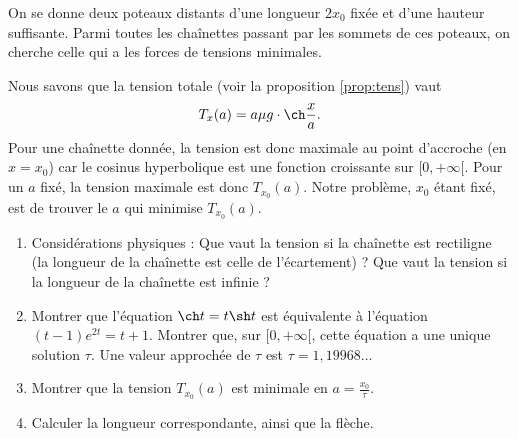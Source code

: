 \documentclass[class=report,crop=false]{standalone}
\begin{document}
\begin{exercicecours}
On se donne deux poteaux distants d'une longueur $2x_0$ fixée et d'une hauteur suffisante.
Parmi toutes les chaînettes passant par les sommets de ces poteaux, on cherche celle
qui a les forces de tensions minimales.

Nous savons que la tension totale (voir la proposition \ref{prop:tens})
vaut 
$$T_x(a) = a \mu g \cdot \ch \frac{x}{a}.$$
Pour une chaînette donnée, la tension est donc maximale au point d'accroche (en $x=x_0$)
car le cosinus hyperbolique est une fonction croissante sur $[0,+\infty[$. Pour un $a$
fixé, la tension maximale est donc $T_{x_0}(a)$. Notre problème, $x_0$ étant fixé, est de trouver
le $a$ qui minimise $T_{x_0}(a)$.
\shorthandoff{:}
\shorthandon{:}
\begin{enumerate}
 \item Considérations physiques : Que vaut la tension si la chaînette est rectiligne (la longueur de la chaînette
est celle de l'écartement) ? Que vaut la tension si la longueur de la chaînette est infinie ?

 \item Montrer que l'équation $\ch t = t \sh t$ est équivalente à l'équation 
$(t-1)e^{2t}=t+1$. Montrer que, sur $[0,+\infty[$, cette équation a une unique solution $\tau$.
Une valeur approchée de $\tau$ est $\tau = 1,19968\ldots$


 \item Montrer que la tension $T_{x_0}(a)$ est minimale en $a= \frac{x_0}{\tau}$.


 \item Calculer la longueur correspondante, ainsi que la flèche.
\shorthandoff{:}
\shorthandon{:}

\end{enumerate}

\end{exercicecours}
\end{document}

